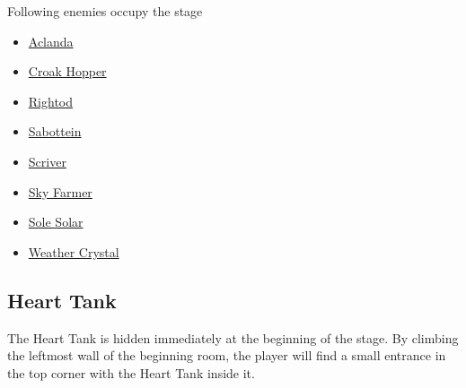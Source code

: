 Following enemies occupy the stage~\cite{wiki:weather_control}
\begin{itemize}
	\item \hyperlink{enem:Aclanda}{Aclanda}
	\item \hyperlink{enem:Croak_hopper}{Croak Hopper}
	\item \hyperlink{enem:Rightod}{Rightod}
	\item \hyperlink{enem:Sabottein}{Sabottein}
	\item \hyperlink{enem:Scriver}{Scriver}
	\item \hyperlink{enem:Sky_farmer}{Sky Farmer}
	\item \hyperlink{enem:Sole_solar}{Sole Solar}
	\item \hyperlink{enem:Weather_crystal}{Weather Crystal}
\end{itemize}


\subsection{Heart Tank}
The Heart Tank is hidden immediately at the beginning of the stage. By climbing the leftmost wall of the beginning room, the player will find a small entrance in the top corner with the Heart Tank inside it.

